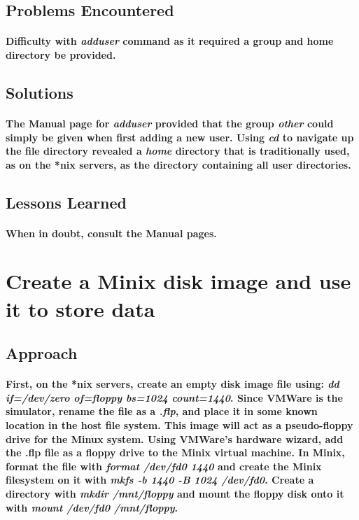 \documentclass[12pt, oneside, a4paper]{article}
\begin{document}
	\subsection*{Problems Encountered}
		\paragraph{
			Difficulty with \emph{adduser} command as it required a group and home
			directory be provided.
		}
	\subsection*{Solutions}
		\paragraph{
			The Manual page for \emph{adduser} provided that the group \emph{other}
			could simply be given when first adding a new user.  Using \emph{cd} to
			navigate up the file directory revealed a \emph{home} directory that is
			traditionally used, as on the *nix servers, as the directory containing all
			user directories.
		}
	\subsection*{Lessons Learned}
		\paragraph{
			When in doubt, consult the Manual pages.
		}
\newpage
		
\section{Create a Minix disk image and use it to store data}
	\subsection*{Approach}
		\paragraph{
			First, on the *nix servers, create an empty disk image file using:
			\emph{dd if=/dev/zero of=floppy bs=1024 count=1440}.  Since VMWare is
			the simulator, rename the file as a \emph{.flp}, and place it in some known
			location in the host file system.  This image will act as a pseudo-floppy drive
			for the Minux system.  Using VMWare's hardware wizard, add the .flp file as
			a floppy drive to the Minix virtual machine.  In Minix, format the file with
			\emph{format /dev/fd0 1440} and create the Minix filesystem on it with
			\emph{mkfs -b 1440 -B 1024 /dev/fd0}.  Create a directory with
			\emph{mkdir /mnt/floppy} and mount the floppy disk onto it with
			\emph{mount /dev/fd0 /mnt/floppy}.
		}
\end{document}
